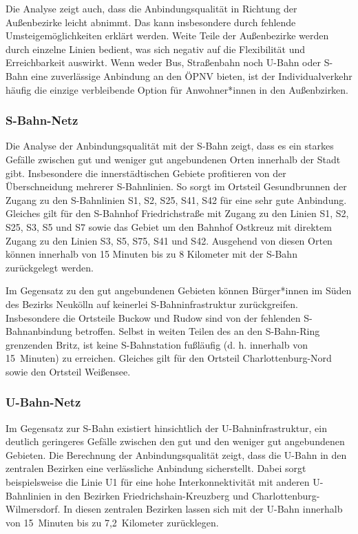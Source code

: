 
Die Analyse zeigt auch, dass die Anbindungsqualität in Richtung der Außenbezirke leicht abnimmt. Das kann insbesondere durch fehlende Umsteigemöglichkeiten erklärt werden. Weite Teile der Außenbezirke werden durch einzelne Linien bedient, was sich negativ auf die Flexibilität und Erreichbarkeit auswirkt. Wenn weder Bus, Straßenbahn noch U-Bahn oder S-Bahn eine zuverlässige Anbindung an den ÖPNV bieten, ist der Individualverkehr häufig die einzige verbleibende Option für Anwohner*innen in den Außenbzirken.

\subsubsection{S-Bahn-Netz}

Die Analyse der Anbindungsqualität mit der S-Bahn zeigt, dass es ein starkes Gefälle zwischen gut und weniger gut angebundenen Orten innerhalb der Stadt gibt. Insbesondere die innerstädtischen Gebiete profitieren von der Überschneidung mehrerer S-Bahnlinien. So sorgt im Ortsteil Gesundbrunnen der Zugang zu den S-Bahnlinien S1, S2, S25, S41, S42 für eine sehr gute Anbindung. Gleiches gilt für den S-Bahnhof Friedrichstraße mit Zugang zu den Linien S1, S2, S25, S3, S5 und S7 sowie das Gebiet um den Bahnhof Ostkreuz mit direktem Zugang zu den Linien S3, S5, S75, S41 und S42. Ausgehend von diesen Orten können innerhalb von 15 Minuten bis zu 8 Kilometer mit der S-Bahn zurückgelegt werden.


Im Gegensatz zu den gut angebundenen Gebieten können Bürger*innen im Süden des Bezirks Neukölln auf keinerlei S-Bahninfrastruktur zurückgreifen. Insbesondere die Ortsteile Buckow und Rudow sind von der fehlenden S-Bahnanbindung betroffen. Selbst in weiten Teilen des an den S-Bahn-Ring grenzenden Britz, ist keine S-Bahnstation fußläufig (d. h. innerhalb von 15~Minuten) zu erreichen. Gleiches gilt für den Ortsteil Charlottenburg-Nord sowie den Ortsteil Weißensee.

\subsubsection{U-Bahn-Netz}

Im Gegensatz zur S-Bahn existiert hinsichtlich der U-Bahninfrastruktur, ein deutlich geringeres Gefälle zwischen den gut und den weniger gut angebundenen Gebieten. Die Berechnung der Anbindungsqualität zeigt, dass die U-Bahn in den zentralen Bezirken eine verlässliche Anbindung sicherstellt. Dabei sorgt beispielsweise die Linie U1 für eine hohe Interkonnektivität mit anderen U-Bahnlinien in den Bezirken Friedrichshain-Kreuzberg und Charlottenburg-Wilmersdorf. In diesen zentralen Bezirken lassen sich mit der U-Bahn innerhalb von 15~Minuten bis zu 7,2~Kilometer zurücklegen.


